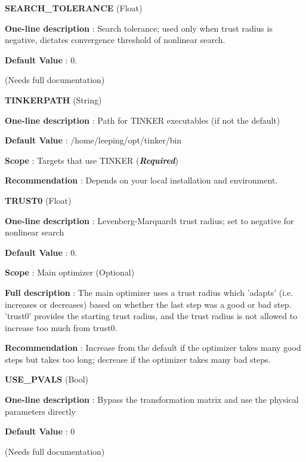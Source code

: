\begin{DoxyItemize}
\item {\bfseries  S\-E\-A\-R\-C\-H\-\_\-\-T\-O\-L\-E\-R\-A\-N\-C\-E } (Float) \par
{\bfseries  One-\/line description }\-: Search tolerance; used only when trust radius is negative, dictates convergence threshold of nonlinear search. \par
{\bfseries  Default Value }\-: 0. \par
(Needs full documentation)\end{DoxyItemize}
\begin{DoxyItemize}
\item {\bfseries  T\-I\-N\-K\-E\-R\-P\-A\-T\-H } (String) \par
{\bfseries  One-\/line description }\-: Path for T\-I\-N\-K\-E\-R executables (if not the default) \par
{\bfseries  Default Value }\-: /home/leeping/opt/tinker/bin \par
{\bfseries  Scope }\-: Targets that use T\-I\-N\-K\-E\-R ({\bfseries {\itshape Required}}) \par
{\bfseries  Recommendation }\-: Depends on your local installation and environment.\end{DoxyItemize}
\begin{DoxyItemize}
\item {\bfseries  T\-R\-U\-S\-T0 } (Float) \par
{\bfseries  One-\/line description }\-: Levenberg-\/\-Marquardt trust radius; set to negative for nonlinear search \par
{\bfseries  Default Value }\-: 0. \par
{\bfseries  Scope }\-: Main optimizer (Optional) \par
{\bfseries  Full description }\-: The main optimizer uses a trust radius which 'adapts' (i.\-e. increases or decreases) based on whether the last step was a good or bad step. 'trust0' provides the starting trust radius, and the trust radius is not allowed to increase too much from trust0. \par
{\bfseries  Recommendation }\-: Increase from the default if the optimizer takes many good steps but takes too long; decrease if the optimizer takes many bad steps.\end{DoxyItemize}
\begin{DoxyItemize}
\item {\bfseries  U\-S\-E\-\_\-\-P\-V\-A\-L\-S } (Bool) \par
{\bfseries  One-\/line description }\-: Bypass the transformation matrix and use the physical parameters directly \par
{\bfseries  Default Value }\-: 0 \par
(Needs full documentation)\end{DoxyItemize}
